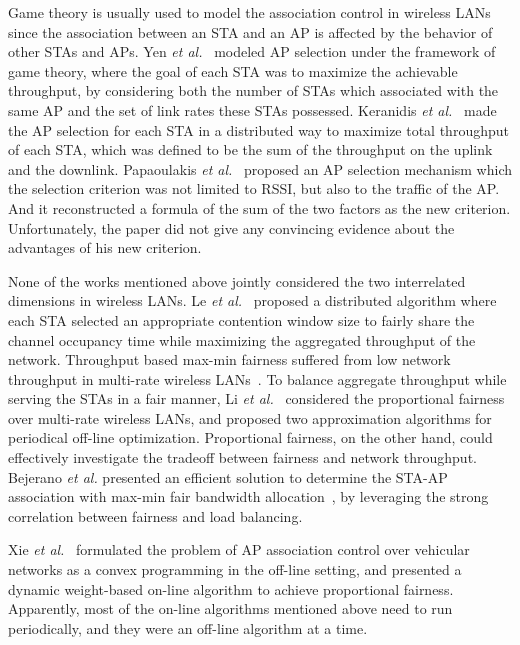 \documentclass[conference]{IEEEtran}
\begin{document}
  Game theory is usually used to model the association control in wireless LANs since the association between an STA and an AP is affected by the behavior of other STAs and APs.  Yen \textit{et al.}~\cite{Yen:2011} modeled AP selection under the framework of game theory, where the goal of each STA was to maximize the achievable throughput, by considering both the number of STAs which associated with the same AP and the set of link rates these STAs possessed.  Keranidis \textit{et al.}~\cite{Keranidis:2011} made the AP selection for each STA in a distributed way to maximize total throughput of each STA, which was defined to be the sum of the throughput on the uplink and the downlink. Papaoulakis \textit{et al.}~\cite{Papaoulakis:2008} proposed an AP selection mechanism which the selection criterion was not limited to RSSI, but also to the traffic of the AP.  And it reconstructed a formula of the sum of the two factors as the new criterion.  Unfortunately, the paper did not give any convincing evidence about the advantages of his new criterion.



  None of the works mentioned above jointly considered the two interrelated dimensions in wireless LANs. Le \textit{et al.}~\cite{le2012maximizing} proposed a distributed algorithm where each STA selected an appropriate contention window size to fairly share the channel occupancy time while maximizing the aggregated throughput of the network.  Throughput based max-min fairness suffered from low network throughput in multi-rate wireless LANs~\cite{Bejerano:2004}.  To balance aggregate throughput while serving the STAs in a fair manner, Li \textit{et al.}~\cite{Li:2008} considered the proportional fairness over multi-rate wireless LANs, and proposed two approximation algorithms for periodical off-line optimization.  Proportional fairness, on the other hand, could effectively investigate the tradeoff between fairness and network throughput.  Bejerano \textit{et al.} presented an efficient solution to determine the STA-AP association with max-min fair bandwidth allocation~\cite{Bejerano:2004}, by leveraging the strong correlation between fairness and load balancing.

  Xie \textit{et al.}~\cite{Lei:2009} formulated the problem of AP association control over vehicular networks as a convex programming in the off-line setting, and presented a dynamic weight-based on-line algorithm to achieve proportional fairness.  Apparently, most of the on-line algorithms mentioned above need to run periodically, and they were an off-line algorithm at a time.
\end{document}
